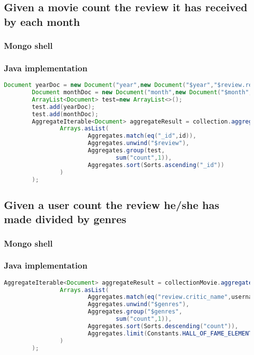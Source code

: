 \subsection{Given a movie count the review it has received by each month}\label{subsec:reviewByYearMonth}
\subsubsection{Mongo shell}

\subsubsection{Java implementation}
\begin{lstlisting}[language=Java, caption = MovieMongoDBDAO.java]
Document yearDoc = new Document("year",new Document("$year","$review.review_date"));
        Document monthDoc = new Document("month",new Document("$month","$review.review_date"));
        ArrayList<Document> test=new ArrayList<>();
        test.add(yearDoc);
        test.add(monthDoc);
        AggregateIterable<Document> aggregateResult = collection.aggregate(
                Arrays.asList(
                        Aggregates.match(eq("_id",id)),
                        Aggregates.unwind("$review"),
                        Aggregates.group(test,
                                sum("count",1)),
                        Aggregates.sort(Sorts.ascending("_id"))
                )
        );
\end{lstlisting}
\subsection{Given a user count the review he/she has made divided by genres}\label{subsec:preferredGenres}
\subsubsection{Mongo shell}


\subsubsection{Java implementation}
\begin{lstlisting}[language=Java, caption = BaseUserMongoDBDAO.java]
AggregateIterable<Document> aggregateResult = collectionMovie.aggregate(
                Arrays.asList(
                        Aggregates.match(eq("review.critic_name",username)),
                        Aggregates.unwind("$genres"),
                        Aggregates.group("$genres",
                                sum("count",1)),
                        Aggregates.sort(Sorts.descending("count")),
                        Aggregates.limit(Constants.HALL_OF_FAME_ELEMENT_NUMBERS)
                )
        );
\end{lstlisting}
